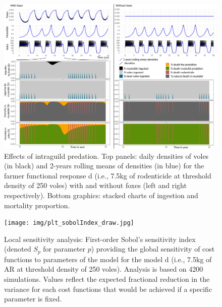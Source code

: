 \documentclass[11pt]{article}
\begin{document}
\begin{figure}
\begin{center}
\includegraphics[width=\linewidth]{img/IGP_Graph.png}
\caption{Effects of intraguild predation. Top panels: daily densities of voles (in black) and 2-years rolling means of densities (in blue) for the farmer functional response d (i.e., 7.5kg of rodenticide at threshold density of 250 voles) with and without foxes (left and right respectively). Bottom graphics: stacked charts of ingestion and mortality proportion.}
\label{fig:intraguild}
\end{center}
\end{figure}






\begin{figure}
	\begin{center}
		\texttt{[image: img/plt\_sobolIndex\_draw.jpg]}
		\caption{Local sensitivity analysis: First-order Sobol's sensitivity index (denoted $S_p$ for parameter $p$) providing the global sensitivity of cost functions to parameters of the model \citep{Sobol1993} for the model d (i.e., 7.5kg of AR at threshold density of 250 voles). Analysis is based on 4200 simulations. Values reflect the expected fractional reduction in the variance for each cost functions that would be achieved if a specific parameter is fixed.}
		\label{fig:sobol_sensitivity}
	\end{center}
\end{figure}
\end{document}
